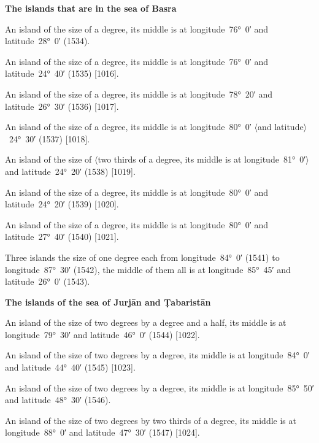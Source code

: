\documentclass[11pt]{article}
\newcommand{\Pg}[1]{\marginpar{\footnotesize #1}}
\newcommand{\Ang}[1]{\ensuremath{#1}}
\begin{document}
\par\medskip\begin{center}\bfseries The islands that are in the sea of Basra\end{center}\par

An island of the size of a degree, its middle is at longitude~76°~0′ and latitude~28°~0′ (1534).

An island of the size of a degree, its middle is at longitude~76°~0′ and latitude~24°~40′ (1535) [1016].

An island of the size of a degree, its middle is at longitude~78°~20′ and latitude~26°~30′ (1536) [1017].

An island of the size of a degree, its middle is at longitude~80°~0′ \Ang{\langle}and latitude\Ang{\rangle}~24°~30′ (1537) [1018].

An island of the size of \Ang{\langle}two thirds of a degree, its middle is at longitude~81°~0′\Ang{\rangle} and latitude~24°~20′ (1538) [1019].

An island of the size of a degree, its middle is at longitude~80°~0′ and latitude~24°~20′ (1539) [1020].

An island of the size of a degree, its middle is at longitude~80°~0′ and latitude~27°~40′ (1540) [1021].

Three islands the size of one degree each from longitude~84°~0′ (1541) to longitude~87°~30′ (1542), the middle of them all is at longitude~85°~45′ and latitude~26°~0′ (1543).

\par\medskip\begin{center}\Pg{p. 101}\bfseries The islands of the sea of Jurjān and Ṭabaristān\end{center}\par

An island of the size of two degrees by a degree and a half, its middle is at longitude~79°~30′ and latitude~46°~0′ (1544) [1022].

An island of the size of two degrees by a degree, its middle is at longitude~84°~0′ and latitude~44°~40′ (1545) [1023].

An island of the size of two degrees by a degree, its middle is at longitude~85°~50′ and latitude~48°~30′ (1546).

An island of the size of two degrees by two thirds of a degree, its middle is at longitude~88°~0′ and latitude~47°~30′ (1547) [1024].
\end{document}
